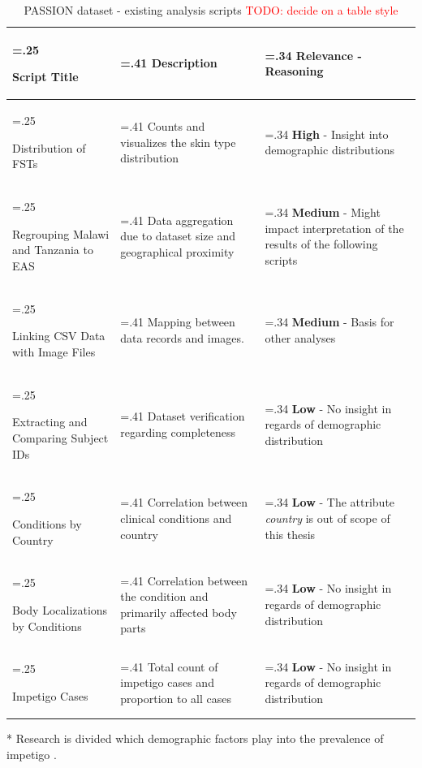 \documentclass[12pt, a4paper, oneside]{book}   	%
\renewcommand{\todo}[1]{\textcolor{red}{TODO: #1}}
\begin{document}
				\begin{table}[H]
					\centering
					\begin{threeparttable}
					\begin{tabularx}{\textwidth}{>{\hsize=.25\hsize\raggedright}X>{\hsize=.41\hsize}X>{\hsize=.34\hsize}X}
						\toprule
						\textbf{Script Title}       & \textbf{Description} & \textbf{Relevance - Reasoning}       \\ \midrule
						Distribution of \glspl{FST} &
						Counts and visualizes the skin type distribution  &
						\textbf{High} - Insight into demographic distributions \\
						\hline
						Regrouping Malawi and Tanzania to EAS &
						Data aggregation due to dataset size and geographical proximity &
						\textbf{Medium} - Might impact interpretation of the results of the following scripts \\
						\hline
						Linking CSV Data with Image Files & 
						Mapping between data records and images. &
						\textbf{Medium} - Basis for other analyses \\
						\hline
						Extracting and Comparing Subject IDs &
						Dataset verification regarding completeness &
						\textbf{Low} - No insight in regards of demographic distribution \\
						\hline
						Conditions by Country &
						Correlation between clinical conditions and country &
						\textbf{Low} - The attribute \textit{country} is out of scope of this thesis \\
						\hline
						Body Localizations by Conditions &
						Correlation between the condition and primarily affected body parts &
						\textbf{Low} - No insight in regards of demographic distribution \\
						\hline
						Impetigo Cases &
						Total count of impetigo cases and proportion to all cases &
						\textbf{Low} - No insight in regards of demographic distribution\tnote{*} \\
						
						\bottomrule
					\end{tabularx}
						\begin{tablenotes}
							\footnotesize
							\item[*] Research is divided which demographic factors play into the prevalence of impetigo \autocites{Romani_2017}{Aleid_2024}.
						\end{tablenotes}
					\end{threeparttable}
					
					\caption{PASSION dataset - existing analysis scripts \autocite{Gottfrois2024} \todo{decide on a table style}}
					\label{tab:PASSION_scripts}
				\end{table}
\end{document}
